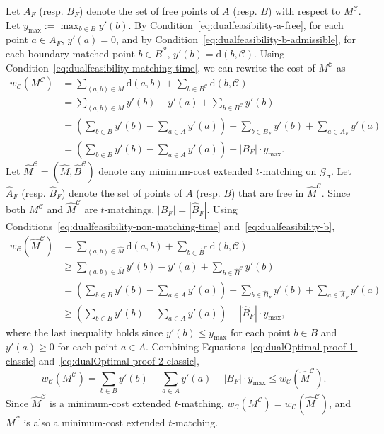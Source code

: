 \documentclass[11pt,onecolumn]{article}
\def\mcC{{\mathcal{C}}}
\def\mcG{{\mathcal{G}}}
\newcommand{\distance}[2]{\mathrm{d}(#1, #2)}
\newcommand{\requests}{\sigma}
\begin{document}
Let $A_F$ (resp. $B_F$) denote the set of free points of $A$ (resp. $B$) with respect to $M^\mcC$. Let $y_{\max}:=\max_{b\in B}y'(b)$. By Condition~\eqref{eq:dualfeasibility-a-free}, for each point $a\in A_F$, $y'(a)=0$, and by Condition~\eqref{eq:dualfeasibility-b-admissible}, for each boundary-matched point $b\in B^\mcC$, $y'(b)=\distance{b}{\mcC}$.
Using Condition~\eqref{eq:dualfeasibility-matching-time}, we can rewrite the cost of $M^\mcC$ as
\begin{align}
    w_\mcC(M^\mcC) &= \sum_{(a,b)\in M} \distance{a}{b} + \sum_{b\in B^\mcC} \distance{b}{\mcC}\nonumber \\ &= \sum_{(a,b)\in M} y'(b) - y'(a) + \sum_{b\in B^\mcC} y'(b)\nonumber \\ &= \left(\sum_{b\in B} y'(b) - \sum_{a\in A} y'(a)\right) - \sum_{b\in B_F} y'(b) + \sum_{a\in A_F} y'(a)\nonumber \\ &= \left(\sum_{b\in B} y'(b) - \sum_{a\in A} y'(a)\right) - |B_F|\cdot y_{\max}.
    \label{eq:dualOptimal-proof-1-classic}
\end{align}
Let $\hat{M}^\mcC= (\hat{M}, \hat{B}^\mcC)$ denote any minimum-cost extended $t$-matching on $\mcG_\requests$. Let $\hat{A}_F$ (resp. $\hat{B}_F$) denote the set of points of $A$ (resp. $B$) that are free in $\hat{M}^\mcC$. Since both $M^\mcC$ and $\hat{M}^\mcC$ are $t$-matchings, $|B_F|=|\hat{B}_F|$. Using Conditions~\eqref{eq:dualfeasibility-non-matching-time} and~\eqref{eq:dualfeasibility-b},
\begin{align}
    w_\mcC(\hat{M}^\mcC) &= \sum_{(a,b)\in \hat{M}} \distance{a}{b} + \sum_{b\in \hat{B}^\mcC} \distance{b}{\mcC}\nonumber \\ &\ge \sum_{(a,b)\in \hat{M}} y'(b) - y'(a) + \sum_{b\in \hat{B}^\mcC} y'(b)\nonumber \\ &= \left(\sum_{b\in B} y'(b) - \sum_{a\in A} y'(a)\right) - \sum_{b\in \hat{B}_F} y'(b) + \sum_{a\in \hat{A}_F} y'(a)\nonumber \\ &\ge \left(\sum_{b\in B} y'(b) - \sum_{a\in A} y'(a)\right) - |\hat{B}_F|\cdot y_{\max},
    \label{eq:dualOptimal-proof-2-classic}
\end{align}
where the last inequality holds since $y'(b)\le y_{\max}$ for each point $b\in B$ and $y'(a)\ge 0$ for each point $a\in A$. Combining Equations~\eqref{eq:dualOptimal-proof-1-classic} and~\eqref{eq:dualOptimal-proof-2-classic},
\[w_\mcC(M^\mcC) = \sum_{b\in B} y'(b) - \sum_{a\in A} y'(a) - |B_F|\cdot y_{\max} \le w_\mcC(\hat{M}^\mcC). \]
Since $\hat{M}^\mcC$ is a minimum-cost extended $t$-matching, $w_\mcC(M^\mcC)=w_\mcC(\hat{M}^\mcC)$, and $M^\mcC$ is also a minimum-cost extended $t$-matching.
\end{document}
